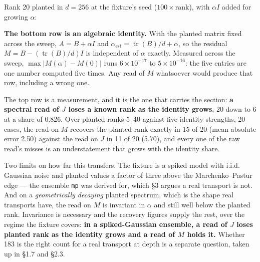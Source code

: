 \documentclass[10pt,letterpaper,twocolumn]{article}
\begin{document}
Rank 20 planted in \(d=256\) at the fixture's seed (\(100\times\text{rank}\)), with \(\alpha I\) added
for growing \(\alpha\):


\textbf{The bottom row is an algebraic identity.} With the planted matrix fixed across the sweep,
\(A=B+\alpha I\) and \(\alpha_{\text{est}}=\operatorname{tr}(B)/d+\alpha\), so the residual
\(M=B-(\operatorname{tr}(B)/d)I\) is independent of \(\alpha\) exactly. Measured across the sweep,
\(\max|M(\alpha)-M(0)|\) runs \(6\times10^{-17}\) to \(5\times10^{-16}\): the five entries are one number
computed five times. Any read of \(M\) whatsoever would produce that row, including a wrong one.

The top row is a measurement, and it is the one that carries the section: \textbf{a spectral read of \(J\)
loses a known rank as the identity grows}, 20 down to 6 at a share of 0.826. Over planted ranks
5--40 against five identity strengths, 20 cases, the read on \(M\) recovers the planted rank exactly
in 15 of 20 (mean absolute error 2.50) against the read on \(J\) in 11 of 20 (5.70), and every one of
the raw read's misses is an understatement that grows with the identity share.

Two limits on how far this transfers. The fixture is a spiked model with i.i.d. Gaussian noise and
planted values a factor of three above the Marchenko--Pastur edge --- the ensemble \texttt{mp} was derived
for, which §3 argues a real transport is not. And on a \emph{geometrically decaying} planted spectrum,
which is the shape real transports have, the read on \(M\) is invariant in \(\alpha\) and still well
below the planted rank. Invariance is necessary and the recovery figures supply the rest, over the
regime the fixture covers: \textbf{in a spiked-Gaussian ensemble, a read of \(J\) loses planted rank as the
identity grows and a read of \(M\) holds it.} Whether 183 is the right count for a real transport at depth is
a separate question, taken up in §1.7 and §2.3.
\end{document}
